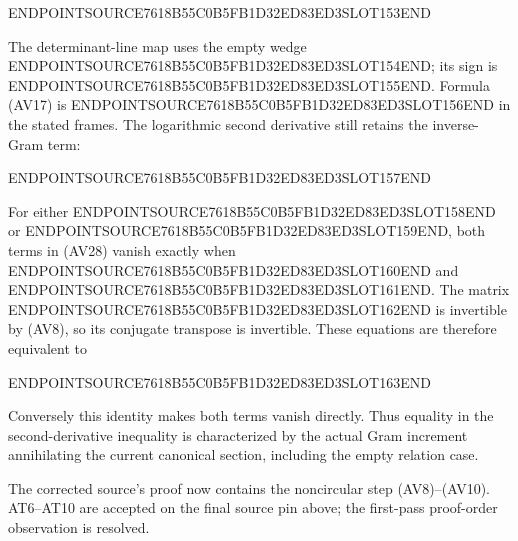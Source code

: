 ENDPOINTSOURCE7618B55C0B5FB1D32ED83ED3SLOT153END

The determinant-line map uses the empty wedge ENDPOINTSOURCE7618B55C0B5FB1D32ED83ED3SLOT154END; its sign is ENDPOINTSOURCE7618B55C0B5FB1D32ED83ED3SLOT155END. Formula (AV17) is ENDPOINTSOURCE7618B55C0B5FB1D32ED83ED3SLOT156END in the stated frames. The logarithmic second derivative still retains the inverse-Gram term:

ENDPOINTSOURCE7618B55C0B5FB1D32ED83ED3SLOT157END

For either ENDPOINTSOURCE7618B55C0B5FB1D32ED83ED3SLOT158END or ENDPOINTSOURCE7618B55C0B5FB1D32ED83ED3SLOT159END, both terms in (AV28) vanish exactly when ENDPOINTSOURCE7618B55C0B5FB1D32ED83ED3SLOT160END and ENDPOINTSOURCE7618B55C0B5FB1D32ED83ED3SLOT161END. The matrix ENDPOINTSOURCE7618B55C0B5FB1D32ED83ED3SLOT162END is invertible by (AV8), so its conjugate transpose is invertible. These equations are therefore equivalent to

ENDPOINTSOURCE7618B55C0B5FB1D32ED83ED3SLOT163END

Conversely this identity makes both terms vanish directly. Thus equality in the second-derivative inequality is characterized by the actual Gram increment annihilating the current canonical section, including the empty relation case.

The corrected source's proof now contains the noncircular step (AV8)--(AV10). AT6--AT10 are accepted on the final source pin above; the first-pass proof-order observation is resolved.
